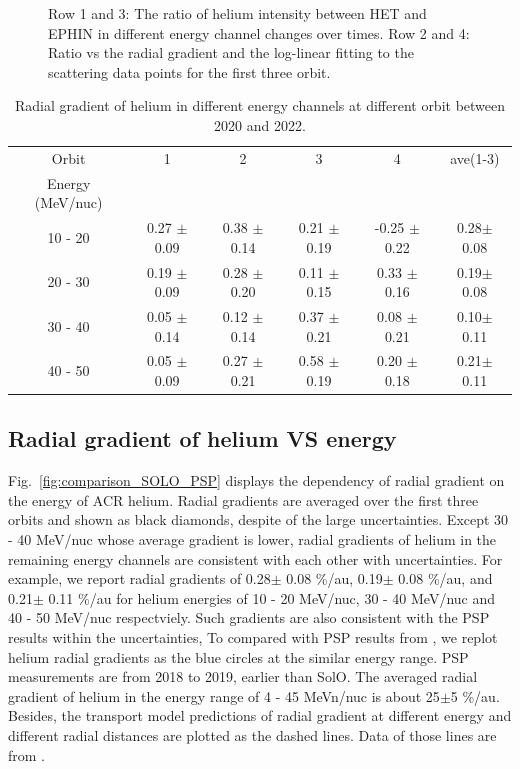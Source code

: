 \begin{figure}[!htb]
    \caption[Ratio of helium intensity between \ac{HET} and \ac{EPHIN} and the radial grdient]{Row 1 and 3: The ratio of helium intensity between \ac{HET} and \ac{EPHIN} in different energy channel changes over times. Row 2 and 4: Ratio vs the radial gradient and the log-linear fitting to the scattering data points for the first three orbit.} 
    \label{fig:ratio_radialgradient}
\end{figure}


\begin{table}[!htb]
    \centering
    \begin{tabular}{|c|c|c|c|c|c|}
        \hline
    Orbit   & 1                 & 2              & 3               & 4  & ave(1-3)\\
    Energy (MeV/nuc)  &         &                &                 &    &\\  
    \hline
    10 - 20 &  0.27 $\pm$ 0.09 & 0.38 $\pm$ 0.14 & 0.21 $\pm$ 0.19 & -0.25 $\pm$ 0.22 & 0.28$\pm$ 0.08\\
    \hline
    20 - 30 &  0.19 $\pm$ 0.09 & 0.28 $\pm$ 0.20 & 0.11 $\pm$ 0.15 & 0.33 $\pm$ 0.16 & 0.19$\pm$ 0.08\\
    \hline
    30 - 40 &  0.05 $\pm$ 0.14 & 0.12 $\pm$ 0.14 & 0.37 $\pm$ 0.21 & 0.08 $\pm$ 0.21 & 0.10$\pm$ 0.11\\
    \hline
    40 - 50 &  0.05 $\pm$ 0.09 & 0.27 $\pm$ 0.21 & 0.58 $\pm$ 0.19 & 0.20 $\pm$ 0.18 & 0.21$\pm$ 0.11\\
    \hline
    \end{tabular}
    \caption[Table of helium radial gradient]{Radial gradient of helium in different energy channels at different orbit between 2020 and 2022.}
    \label{Tab:radialgradient_1}
\end{table}
\subsection*{Radial gradient of helium VS energy}

Fig.~\ref{fig:comparison_SOLO_PSP} displays the dependency of radial gradient on the energy of \ac{ACR} helium. Radial gradients are averaged over the first three orbits and shown as black diamonds, despite of the large uncertainties. Except 30 - 40 MeV/nuc whose average gradient is lower, radial gradients of helium in the remaining energy channels are consistent with each other with uncertainties. For example, we report radial gradients of 0.28$\pm$ 0.08 \%/au, 0.19$\pm$ 0.08 \%/au, and 0.21$\pm$ 0.11 \%/au for helium energies of 10 - 20 MeV/nuc, 30 - 40 MeV/nuc and 40 - 50 MeV/nuc respectviely. Such gradients are also consistent with the \ac{PSP} results within the uncertainties,
To compared with \ac{PSP} results from \citet{Rankin2021ApJ}, we replot helium radial gradients as the blue circles at the similar energy range. \ac{PSP} measurements are from 2018 to 2019, earlier than \ac{SolO}. The averaged radial gradient of helium in the energy range of 4 - 45 MeVn/nuc is about 25$\pm$5 \%/au. 
Besides, the transport model predictions of radial gradient at different energy and different radial distances are plotted as the dashed lines. Data of those lines are from \citet{Rankin2021ApJ,Strauss2010JGRA}.




